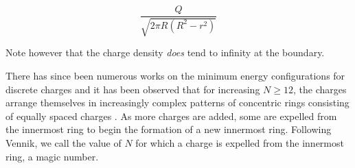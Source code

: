 \documentclass[12pt,a4paper,final]{iopart}
\begin{document}
\begin{equation}
\frac{Q}{\sqrt{2\pi R(R^2-r^2)}}
\end{equation} 

Note however that the charge density \emph{does} tend to infinity at the boundary. 

There has since been numerous works on the minimum energy configurations for discrete charges and it has been observed that for increasing $N \geq 12$, the charges arrange themselves in increasingly complex patterns of concentric rings consisting of equally spaced charges \cite{queen85, rees85, vennik85}. As more charges are added, some are expelled from the innermost ring to begin the formation of a new innermost ring. Following Vennik, we call the value of $N$ for which a charge is expelled from the innermost ring, a magic number. 
\end{document}
